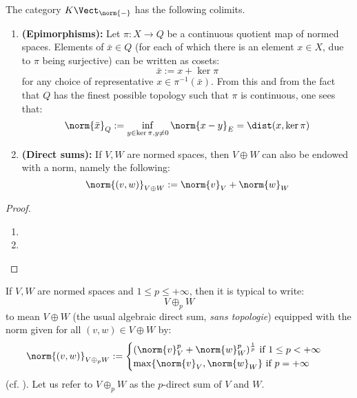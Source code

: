        \begin{lemma} \label{lemma: colimits_of_normed_spaces}
            The category $K\-\Vect_{\norm{-}}$ has the following colimits.
            \begin{enumerate}
                \item \textbf{(Epimorphisms):} Let $\pi: X \to Q$ be a continuous quotient map of normed spaces. Elements of $\bar{x} \in Q$ (for each of which there is an element $x \in X$, due to $\pi$ being surjective) can be written as cosets:
                    $$\bar{x} := x + \ker \pi$$
                for any choice of representative $x \in \pi^{-1}(\bar{x})$. From this and from the fact that $Q$ has the finest possible topology such that $\pi$ is continuous, one sees that:
                    $$\norm{\bar{x}}_Q := \inf_{y \in \ker \pi, y \not = 0} \norm{x - y}_E = \dist(x, \ker \pi)$$
                \item \textbf{(Direct sums):} If $V, W$ are normed spaces, then $V \oplus W$ can also be endowed with a norm, namely the following:
                    $$\norm{(v, w)}_{V \oplus W} := \norm{v}_V + \norm{w}_W$$
            \end{enumerate}
        \end{lemma}
            \begin{proof}
                \begin{enumerate}
                    \item 
                    \item 
                \end{enumerate}
            \end{proof}


        \begin{convention} \label{conv: ell_p_direct_sums}
            If $V, W$ are normed spaces and $1 \leq p \leq +\infty$, then it is typical to write:
                $$V \oplus_p W$$
            to mean $V \oplus W$ (the usual algebraic direct sum, \textit{sans topologie}) equipped with the norm given for all $(v, w) \in V \oplus W$ by:
                $$
                    \norm{(v, w)}_{V \oplus_p W} :=
                    \begin{cases}
                        \text{$(\norm{v}_V^p + \norm{w}_W^p)^{\frac1p}$ if $1 \leq p < +\infty$}
                        \\
                        \text{$\max\{ \norm{v}_V, \norm{w}_W \}$ if $p = +\infty$}
                    \end{cases}
                $$
            (cf. \cite[Example, p. 24]{litvak_functional_analysis_notes}). Let us refer to $V \oplus_p W$ as the $p$-direct sum of $V$ and $W$.
        \end{convention}

